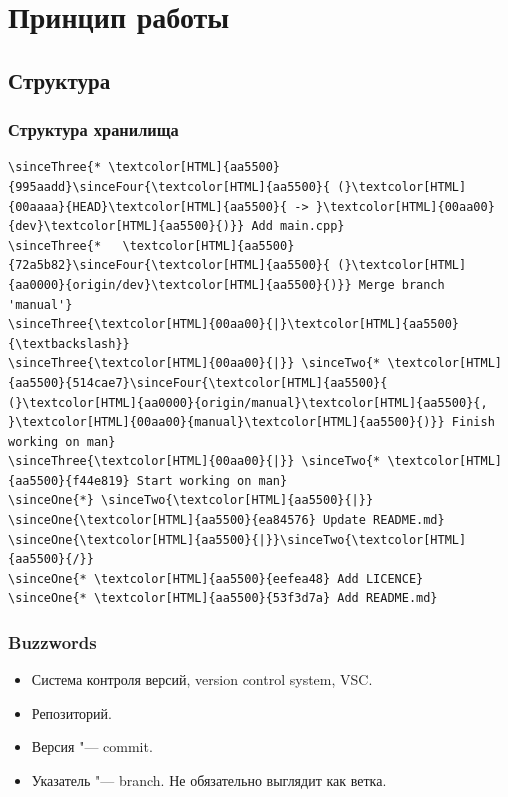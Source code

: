 \documentclass[pdf,russian]{beamer}
\begin{document}
\section{Принцип работы}

\subsection{Структура}

\begin{frame}[fragile]
    \frametitle{Структура хранилища}


    \newcommand{\sinceOne}[1]{\onslide<2->{#1}}
    \newcommand{\sinceTwo}[1]{\onslide<4->{#1}}
    \newcommand{\sinceThree}[1]{\onslide<6->{#1}}
    \newcommand{\sinceFour}[1]{\onslide<8->{#1}}

    \begin{block}{}
        \begin{Verbatim}[commandchars=\\\{\}]
\sinceThree{* \textcolor[HTML]{aa5500}{995aadd}\sinceFour{\textcolor[HTML]{aa5500}{ (}\textcolor[HTML]{00aaaa}{HEAD}\textcolor[HTML]{aa5500}{ -> }\textcolor[HTML]{00aa00}{dev}\textcolor[HTML]{aa5500}{)}} Add main.cpp}
\sinceThree{*   \textcolor[HTML]{aa5500}{72a5b82}\sinceFour{\textcolor[HTML]{aa5500}{ (}\textcolor[HTML]{aa0000}{origin/dev}\textcolor[HTML]{aa5500}{)}} Merge branch 'manual'}
\sinceThree{\textcolor[HTML]{00aa00}{|}\textcolor[HTML]{aa5500}{\textbackslash}}
\sinceThree{\textcolor[HTML]{00aa00}{|}} \sinceTwo{* \textcolor[HTML]{aa5500}{514cae7}\sinceFour{\textcolor[HTML]{aa5500}{ (}\textcolor[HTML]{aa0000}{origin/manual}\textcolor[HTML]{aa5500}{, }\textcolor[HTML]{00aa00}{manual}\textcolor[HTML]{aa5500}{)}} Finish working on man}
\sinceThree{\textcolor[HTML]{00aa00}{|}} \sinceTwo{* \textcolor[HTML]{aa5500}{f44e819} Start working on man}
\sinceOne{*} \sinceTwo{\textcolor[HTML]{aa5500}{|}} \sinceOne{\textcolor[HTML]{aa5500}{ea84576} Update README.md}
\sinceOne{\textcolor[HTML]{aa5500}{|}}\sinceTwo{\textcolor[HTML]{aa5500}{/}}
\sinceOne{* \textcolor[HTML]{aa5500}{eefea48} Add LICENCE}
\sinceOne{* \textcolor[HTML]{aa5500}{53f3d7a} Add README.md}
        \end{Verbatim}
    \end{block}
\end{frame}

\begin{frame}
    \frametitle{Buzzwords}
    \begin{itemize}
        \pause
        \item Система контроля версий, version control system, VSC.
        \pause
        \item Репозиторий.
        \pause
        \item Версия "--- commit.
        \pause
        \item Указатель "--- branch. \pause Не обязательно выглядит как ветка.
    \end{itemize}
\end{frame}
\end{document}

